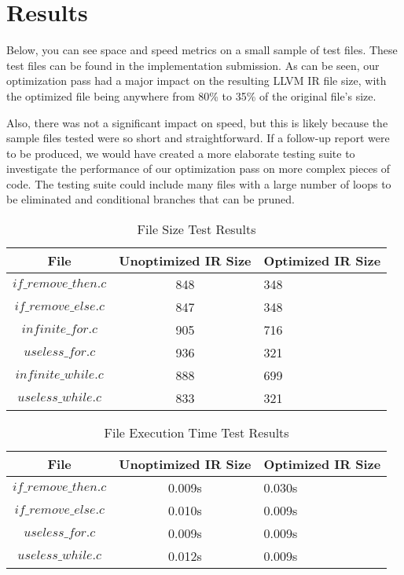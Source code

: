\documentclass[sigconf]{acmart}
\begin{document}
\section{Results}
Below, you can see space and speed metrics on a small sample of test files. These test files can 
be found in the implementation submission.
As can be seen, our optimization pass had a major impact on the resulting LLVM IR file size, with the 
optimized file being anywhere from 80\% to 35\% of the original file's size. 

Also, there was not a significant impact on speed, but this is likely because the sample files tested were so 
short and straightforward. If a follow-up report were to be produced, we would have created a more 
elaborate testing suite to investigate the performance of our optimization pass on more complex 
pieces of code. The testing suite could include many files with a large number of loops to be 
eliminated and conditional branches that can be pruned.



\begin{table*}
  \caption{File Size Test Results}
  \begin{tabular}{ccl}
    \toprule
    File & Unoptimized IR Size & Optimized IR Size \\
    \midrule
    \texttt{$if\_remove\_then.c$}& 848& 348 \\
    \texttt{$if\_remove\_else.c$}&  847& 348\\
    \texttt{$infinite\_for.c$}& 905& 716 \\
    \texttt{$useless\_for.c$}& 936& 321  \\
    \texttt{$infinite\_while.c$}& 888 & 699 \\
    \texttt{$useless\_while.c$}& 833 & 321  \\
    \bottomrule
  \end{tabular}
\end{table*}

\begin{table*}
  \caption{File Execution Time Test Results}
  \label{tab:commands}
  \begin{tabular}{ccl}
    \toprule
    File & Unoptimized IR Size & Optimized IR Size \\
    \midrule
    \texttt{$if\_remove\_then.c$}& 0.009s & 0.030s \\
    \texttt{$if\_remove\_else.c$}&  0.010s & 0.009s \\
    \texttt{$useless\_for.c$}& 0.009s & 0.009s  \\
    \texttt{$useless\_while.c$}& 0.012s &  0.009s \\
    \bottomrule
  \end{tabular}
\end{table*}
\end{document}
